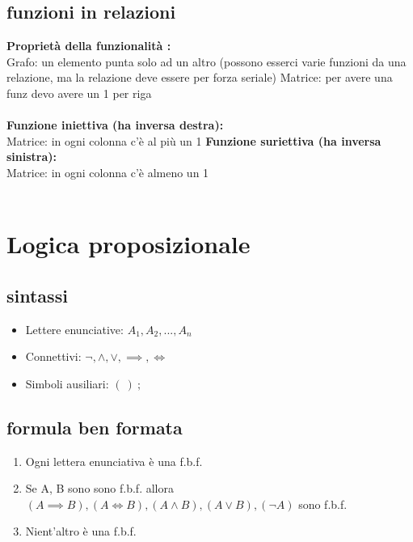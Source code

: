 \documentclass{article}
\begin{document}
\begin{multicols*}{3}
 		\subsection{funzioni in relazioni}
 		\textbf{Proprietà della funzionalità :}\\
 		Grafo: un elemento punta solo ad un altro (possono esserci varie funzioni da una relazione, ma la relazione deve essere per forza seriale)
 		Matrice: per avere una funz devo avere un 1 per riga \\\\
 		\textbf{Funzione iniettiva (ha inversa destra):}\\
 		Matrice: in ogni colonna c'è al più un 1
 		\textbf{Funzione suriettiva (ha inversa sinistra):}\\
 		Matrice: in ogni colonna c'è almeno un 1\\\\
 		
 		
 		
 		
	 	\section{Logica proposizionale}
	 	
	 	\subsection{sintassi}
	 	\begin{itemize}
	 		\setlength\itemsep{0.1mm}
	 		\item Lettere enunciative: \( A_1, A_2, ... , A_n\) 
	 		\item Connettivi: \(\neg, \land, \lor, \implies, \iff \)
	 		\item Simboli ausiliari: \( (\ )\ ; \)
	 	\end{itemize}
 		
 		\subsection{formula ben formata}
 		\begin{enumerate}
 			\item Ogni lettera enunciativa è una f.b.f.
 			\item Se A, B sono sono f.b.f. allora \( (A\implies B),(A \iff B) , (A \land B), (A\lor B), (\neg A) \) sono f.b.f.
 			\item Nient'altro è una f.b.f.
 		\end{enumerate}
 		

\end{multicols*}
\end{document}
